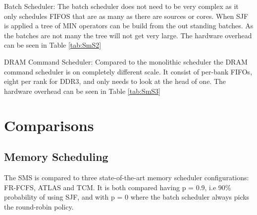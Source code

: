 \documentclass[12pt,journal,compsoc]{IEEEtran}
\begin{document}
Batch Scheduler:  The batch scheduler does not need to be very complex as it only schedules FIFOS that are as many as there are sources or cores.  When SJF is applied a tree of MIN operators can be build from the out standing batches.  As the batches are not many the tree will not get very large. The hardware overhead can be seen in Table \ref{tab:SmS2}

\begin{table}[H]
  \centering
  \caption{Storage Overhead of Stage 2: Batch Schedule \cite{SmS}}\label{tab:SmS2}
\end{table}

DRAM Command Scheduler:   Compared to the monolithic scheduler the DRAM command scheduler is on completely different scale.  It consist of per-bank FIFOs, eight per rank for DDR3, and only needs to look at the head of one. The hardware overhead can be seen in Table \ref{tab:SmS3}

\begin{table}[H]
  \centering
  \caption{Storage Overhead of Stage 3: DRAM Command Scheduler \cite{SmS}}\label{tab:SmS3}
\end{table}


\section{Comparisons}
\subsection{Memory Scheduling}
The SMS is compared to three state-of-the-art memory scheduler configurations: FR-FCFS, ATLAS and TCM.  It is both compared having p = 0.9, i.e  90\% probability of using SJF, and with p = 0 where the batch scheduler always picks the round-robin policy.
\end{document}
